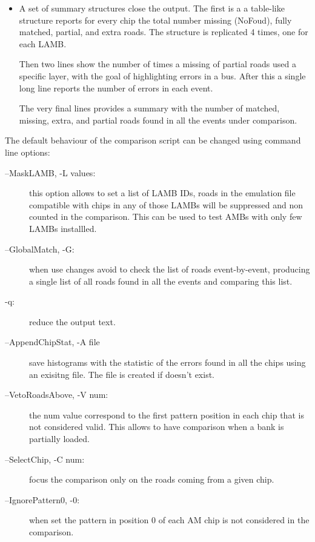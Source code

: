 \begin{itemize}
	\item A set of summary structures close the output. The first is a
	a table-like structure reports for every chip the total number
	missing (NoFoud), fully matched, partial, and extra roads. The structure is
	replicated 4 times, one for each LAMB.
	
	Then two lines show the number of times a missing of partial roads used
	a specific layer, with the goal of highlighting errors in a bus. After this a single long line reports the number of errors in each event.
	
	The very final lines provides a summary with the number of matched, missing,
	extra, and partial roads found in all the events under comparison.
	 
\end{itemize}

The default behaviour of the comparison script can be changed using command
line options:
\begin{description}
	\item[--MaskLAMB, -L values:] this option allows to set a list of LAMB
	IDs, roads in the emulation file compatible with chips in any of those
	LAMBs will be suppressed and non counted in the comparison. This can be used
	to test AMBs  with only few LAMBs installled.
	
	\item[--GlobalMatch, -G:] when use changes avoid to check the list of roads
	event-by-event, producing a single list of all roads found in all the
	events and comparing this list.
	
	\item[-q:] reduce the output text.
	
	\item[--AppendChipStat, -A file] save histograms with the statistic of 
	the errors found in all the chips using an exisitng file. The file is
	created if doesn't exist.
	
	\item[--VetoRoadsAbove, -V num:] the num value correspond to the first
	pattern position in each chip that is not considered valid. This allows
	to have comparison when a bank is partially loaded.
	
	\item[--SelectChip, -C num:] focus the comparison only on the roads
	coming from a given chip.
	
	\item[--IgnorePattern0, -0:] when set the pattern in position 0 of each
	AM chip is not considered in the comparison.
\end{description}